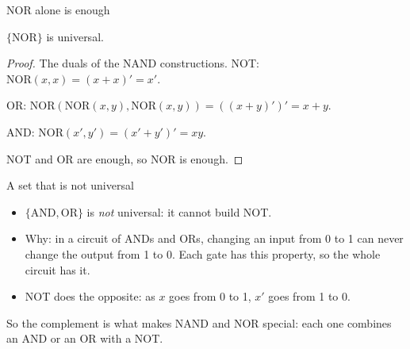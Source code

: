 \documentclass[10pt]{wosm-slides}
\begin{document}
\begin{frame}{NOR alone is enough}
  \begin{theorem}
    $\{\mathrm{NOR}\}$ is universal.
  \end{theorem}

  \begin{proof}
    \small
    The duals of the NAND constructions. NOT: $\mathrm{NOR}(x, x) = (x + x)' = x'$.\par
    OR: $\mathrm{NOR}(\mathrm{NOR}(x, y), \mathrm{NOR}(x, y)) = ((x + y)')' = x + y$.\par
    AND: $\mathrm{NOR}(x', y') = (x' + y')' = xy$.\par
    NOT and OR are enough, so NOR is enough.
  \end{proof}

\end{frame}

\begin{frame}{A set that is not universal}
  \begin{itemize}
    \item $\{\mathrm{AND}, \mathrm{OR}\}$ is \emph{not} universal: it cannot build
      NOT.
    \item Why: in a circuit of ANDs and ORs, changing an input from 0 to 1 can never
      change the output from 1 to 0. Each gate has this property, so the whole
      circuit has it.
    \item NOT does the opposite: as $x$ goes from 0 to 1, $x'$ goes from 1 to 0.
  \end{itemize}

  \bigskip
  \begin{remark}
    So the complement is what makes NAND and NOR special: each one combines an
    AND or an OR with a NOT.
  \end{remark}
\end{frame}
\end{document}
